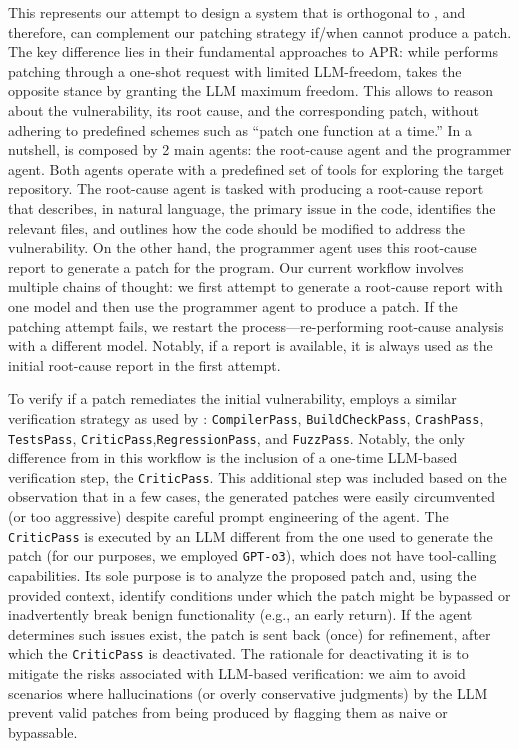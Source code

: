 This represents our attempt to design a system that is orthogonal to \patchery, and therefore, can complement our patching strategy if/when \patchery cannot produce a patch.
The key difference lies in their fundamental approaches to APR: while \patchery performs patching through a one-shot request with limited LLM-freedom, \patcherq takes the opposite stance by granting the LLM maximum freedom. 
This allows \patcherq to reason about the vulnerability, its root cause, and the corresponding patch, without adhering to predefined schemes such as ``patch one function at a time.''
In a nutshell, \patcherq is composed by 2 main agents: the root-cause agent and the programmer agent.
Both agents operate with a predefined set of tools for exploring the target repository. 
The root-cause agent is tasked with producing a root-cause report that describes, in natural language, the primary issue in the code, identifies the relevant files, and outlines how the code should be modified to address the vulnerability. 
On the other hand, the programmer agent uses this root-cause report to generate a patch for the program.
Our current workflow involves multiple chains of thought: we first attempt to generate a root-cause report with one model and then use the programmer agent to produce a patch. If the patching attempt fails, we restart the process—re-performing root-cause analysis with a different model. Notably, if a \dyva report is available, it is always used as the initial root-cause report in the first attempt.

To verify if a patch remediates the initial vulnerability, \patcherq employs a similar verification strategy as used by \patchery: \texttt{CompilerPass}, \texttt{BuildCheckPass}, \texttt{CrashPass}, \texttt{TestsPass}, \texttt{CriticPass},\texttt{RegressionPass}, and \texttt{FuzzPass}.
Notably, the only difference from \patchery in this workflow is the inclusion of a one-time LLM-based verification step, the \texttt{CriticPass}. 
This additional step was included based on the observation that in a few cases, the generated patches were easily circumvented (or too aggressive) despite careful prompt engineering of the agent.
The \texttt{CriticPass} is executed by an LLM different from the one used to generate the patch (for our purposes, we employed \texttt{GPT-o3}), which does not have tool-calling capabilities. 
Its sole purpose is to analyze the proposed patch and, using the provided context, identify conditions under which the patch might be bypassed or inadvertently break benign functionality (e.g., an early return).
If the agent determines such issues exist, the patch is sent back (once) for refinement, after which the \texttt{CriticPass} is deactivated. 
The rationale for deactivating it is to mitigate the risks associated with LLM-based verification: we aim to avoid scenarios where hallucinations (or overly conservative judgments) by the LLM prevent valid patches from being produced by flagging them as naive or bypassable.


